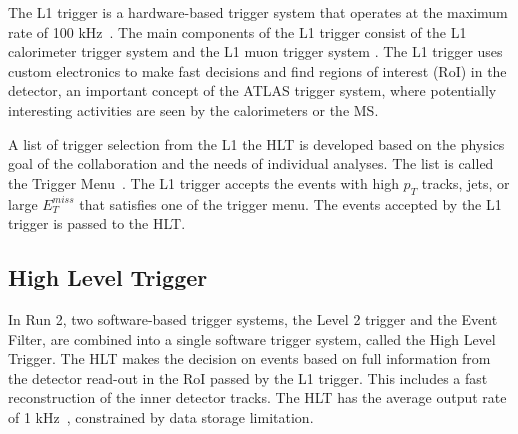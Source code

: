 The L1 trigger is a hardware-based trigger system that operates at the maximum rate of 100 \si{\kilo\hertz}~\cite{1742-6596-762-1-012003}. The main components of the L1 trigger consist of the L1 calorimeter trigger system and the L1 muon trigger system . The L1 trigger uses custom electronics to make fast decisions and find regions of interest (RoI) in the detector, an important concept of the ATLAS trigger system, where potentially interesting activities are seen by the calorimeters or the MS.

A list of trigger selection from the L1 the HLT is developed based on the physics goal of the collaboration and the needs of individual analyses. The list is called the Trigger Menu~\cite{VazquezSchroeder:2287548}. The L1 trigger accepts the events with high $p_{T}$ tracks, jets, or large $E_{T}^{miss}$ that satisfies one of the trigger menu. The events accepted by the L1 trigger is passed to the HLT.


\subsection{High Level Trigger}
\label{sec:atlas:hlt}

In Run 2, two software-based trigger systems, the Level 2 trigger and the Event Filter, are combined into a single software trigger system, called the High Level Trigger. The HLT makes the decision on events based on full information from the detector read-out in the RoI passed by the L1 trigger. This includes a fast reconstruction of the inner detector tracks. The HLT has the average output rate of 1 \si{\kilo\hertz}~\cite{1742-6596-762-1-012003}, constrained by data storage limitation. 


